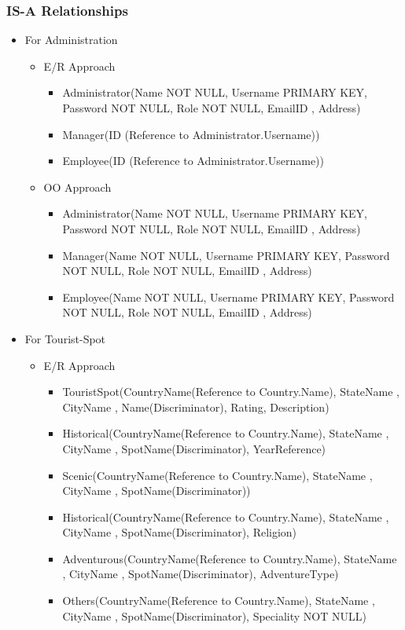\documentclass[11pt]{article}
\begin{document}
\subsubsection{IS-A Relationships}
\begin{itemize}
\item For Administration
\begin{itemize}
\item E/R Approach
\begin{itemize}
\item Administrator(Name NOT NULL, Username PRIMARY KEY, Password NOT NULL, Role NOT NULL, EmailID , Address)
\item Manager(ID (Reference to Administrator.Username))
\item Employee(ID (Reference to Administrator.Username))
\end{itemize}
\item OO Approach
\begin{itemize}
\item Administrator(Name NOT NULL, Username PRIMARY KEY, Password NOT NULL, Role NOT NULL, EmailID , Address)
\item Manager(Name NOT NULL, Username PRIMARY KEY, Password NOT NULL, Role NOT NULL, EmailID , Address)
\item Employee(Name NOT NULL, Username PRIMARY KEY, Password NOT NULL, Role NOT NULL, EmailID , Address)
\end{itemize}
\end{itemize} 
\item For Tourist-Spot
\begin{itemize}
\item E/R Approach
\begin{itemize}
\item TouristSpot(CountryName(Reference to Country.Name), StateName , CityName , Name(Discriminator), Rating, Description)

\item Historical(CountryName(Reference to Country.Name), StateName , CityName , SpotName(Discriminator), YearReference)
\item Scenic(CountryName(Reference to Country.Name), StateName , CityName , SpotName(Discriminator))
\item Historical(CountryName(Reference to Country.Name), StateName , CityName , SpotName(Discriminator), Religion)
\item Adventurous(CountryName(Reference to Country.Name), StateName , CityName , SpotName(Discriminator), AdventureType)
\item Others(CountryName(Reference to Country.Name), StateName , CityName , SpotName(Discriminator), Speciality NOT NULL)


\end{itemize}
\end{itemize}
\end{itemize}
\end{document}

